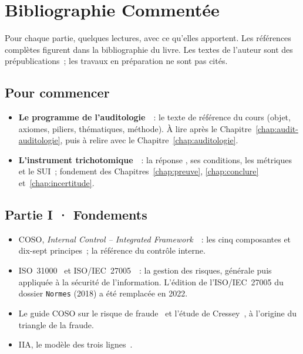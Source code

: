
\chapter{Bibliographie Commentée}
\label{ann:bibliographie}

Pour chaque partie, quelques lectures, avec ce qu'elles apportent. Les
références complètes figurent dans la bibliographie du livre. Les textes
de l'auteur sont des prépublications~; les travaux en préparation ne sont
pas cités.

\section*{Pour commencer}

\begin{itemize}
    \item \textbf{Le programme de l'auditologie}~\cite{minka2026auditologie}~:
          le texte de référence du cours (objet, axiomes, piliers,
          thématiques, méthode). À lire après le
          Chapitre~\ref{chap:audit-auditologie}, puis à relire avec le
          Chapitre~\ref{chap:auditologie}.
    \item \textbf{L'instrument trichotomique}~\cite{minka2026nek}~: la
          réponse \NEK{}, ses conditions, les métriques et le SUI~;
          fondement des Chapitres~\ref{chap:preuve}, \ref{chap:conclure}
          et~\ref{chap:incertitude}.
\end{itemize}

\section*{Partie I · Fondements}

\begin{itemize}
    \item COSO, \emph{Internal Control -- Integrated Framework}~\cite{coso2013ic}~:
          les cinq composantes et dix-sept principes~; la référence du
          contrôle interne.
    \item ISO~31000~\cite{iso31000_2018} et ISO/IEC~27005~\cite{iso27005_2018}~:
          la gestion des risques, générale puis appliquée à la sécurité de
          l'information. L'édition de l'ISO/IEC~27005 du dossier
          \texttt{Normes} (2018) a été remplacée en 2022.
    \item Le guide COSO sur le risque de fraude~\cite{coso2016fraude} et
          l'étude de Cressey~\cite{cressey1953}, à l'origine du triangle de
          la fraude.
    \item IIA, le modèle des trois lignes~\cite{iia2020troislignes}.
\end{itemize}

